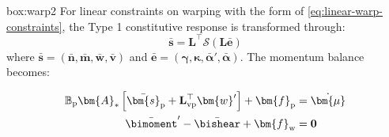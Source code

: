 %
\vspace{1ex}
\begin{ambox}{box:warp2}
For linear constraints on warping with the form of \eqref{eq:linear-warp-constraints}, the Type 1 constitutive response is transformed through:
\[
\bar{\bm{s}} = \mathbf{L}^{\top}\mathcal{S}(\mathbf{L}\bar{\bm{e}})
\]
where \(\bar{\bm{s}} = (\bar{\bm{n}}, \bar{\bm{m}}, \bar{\bm{w}}, \bar{\bm{v}})\) and \(\bar{\bm{e}} = (\bm{\gamma}, \bm{\kappa}, \bar{\bm{\alpha}}', \bar{\bm{\alpha}})\).
The momentum balance becomes:

\begin{equation}
\begin{aligned}
    \mathbb{B}_{\mathrm{p}} \bm{A}_* \left[\bar{\bm{s}}_{\mathrm{p}} + \mathbf{L}_{\rm vp}^{\top}\bm{w}'\right]+ \bm{f}_{\mathrm{p}} &= \dot{\bm{\mu}} \\ 
    \bar{\bimoment}' - \bar{\bishear} + \bm{f}_{\mathrm{w}} &= \mathbf{0}
\end{aligned}
\label{eq:type2-equilibrium}
\end{equation}
\end{ambox}

